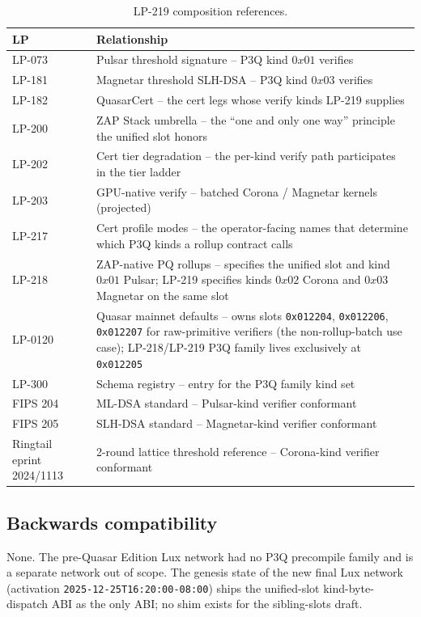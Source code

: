 \begin{table}[h]
\centering
\small
\begin{tabular}{@{}lp{9cm}@{}}
\toprule
\textbf{LP} & \textbf{Relationship} \\
\midrule
LP-073 & Pulsar threshold signature -- P3Q kind $0x01$ verifies \\
LP-181 & Magnetar threshold SLH-DSA -- P3Q kind $0x03$ verifies \\
LP-182 & QuasarCert -- the cert legs whose verify kinds LP-219 supplies \\
LP-200 & ZAP Stack umbrella -- the ``one and only one way'' principle the unified slot honors \\
LP-202 & Cert tier degradation -- the per-kind verify path participates in the tier ladder \\
LP-203 & GPU-native verify -- batched Corona / Magnetar kernels (projected) \\
LP-217 & Cert profile modes -- the operator-facing names that determine which P3Q kinds a rollup contract calls \\
LP-218 & ZAP-native PQ rollups -- specifies the unified slot and kind $0x01$ Pulsar; LP-219 specifies kinds $0x02$ Corona and $0x03$ Magnetar on the same slot \\
LP-0120 & Quasar mainnet defaults -- owns slots \texttt{0x012204},
  \texttt{0x012206}, \texttt{0x012207} for raw-primitive verifiers
  (the non-rollup-batch use case); LP-218/LP-219 P3Q family
  lives exclusively at \texttt{0x012205} \\
LP-300 & Schema registry -- entry for the P3Q family kind set \\
FIPS 204 & ML-DSA standard -- Pulsar-kind verifier conformant \\
FIPS 205 & SLH-DSA standard -- Magnetar-kind verifier conformant \\
Ringtail eprint 2024/1113 & 2-round lattice threshold reference -- Corona-kind verifier conformant \\
\bottomrule
\end{tabular}
\caption{LP-219 composition references.}
\label{tab:composition-refs}
\end{table}

\subsection{Backwards compatibility}

None. The pre-Quasar Edition Lux network had no P3Q precompile
family and is a separate network out of scope. The genesis state
of the new final Lux network (activation
\texttt{2025-12-25T16:20:00-08:00}) ships the unified-slot
kind-byte-dispatch ABI as the only ABI; no shim exists for the
sibling-slots draft.


